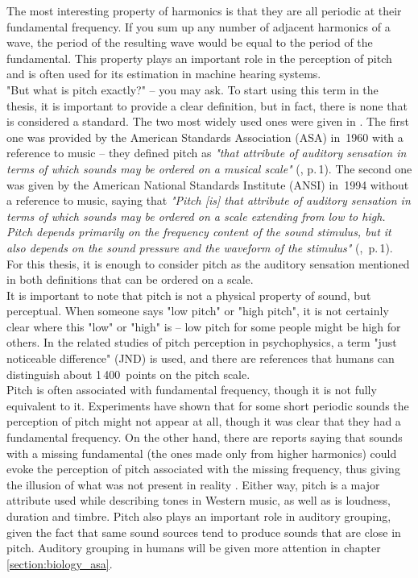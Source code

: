The most interesting property of harmonics is that they are all periodic at their fundamental frequency. If you sum up any number of adjacent harmonics of a wave, the period of the resulting wave would be equal to the period of the fundamental. This property plays an important role in the perception of pitch and is often used for its estimation in machine hearing systems.\\

"But what is pitch exactly?" -- you may ask. To start using this term in the thesis, it is important to provide a clear definition, but in fact, there is none that is considered a standard. The two most widely used ones were given in \cite{Plack2005}. The first one was provided by the American Standards Association (ASA) in~1960 with a reference to music -- they defined pitch as \textit{"that attribute of auditory sensation in terms of which sounds may be ordered on a musical scale"} (\cite{Plack2005}, p.\,1). The second one was given by the American National Standards Institute (ANSI) in~1994 without a reference to music, saying that \textit{"Pitch [is] that attribute of auditory sensation in terms of which sounds may be ordered on a scale extending from low to high. Pitch depends primarily on the frequency content of the sound stimulus, but it also depends on the sound pressure and the waveform of the stimulus"} (\cite{Plack2005},~p.\,1). For this thesis, it is enough to consider pitch as the auditory sensation mentioned in both definitions that can be ordered on a scale.\\

It is important to note that pitch is not a physical property of sound, but perceptual. When someone says "low pitch" or "high pitch", it is not certainly clear where this "low" or "high" is -- low pitch for some people might be high for others. In the related studies of pitch perception in psychophysics, a term "just noticeable difference" (JND) is used, and there are references that humans can distinguish about 1\,400~points on the pitch scale.\\

Pitch is often associated with fundamental frequency, though it is not fully equivalent to it. Experiments have shown that for some short periodic sounds the perception of pitch might not appear at all, though it was clear that they had a fundamental frequency. On the other hand, there are reports saying that sounds with a missing fundamental (the ones made only from higher harmonics) could evoke the perception of pitch associated with the missing frequency, thus giving the illusion of what was not present in reality \cite{Schnupp2011}. Either way, pitch is a major attribute used while describing tones in Western music, as well as is loudness, duration and timbre. Pitch also plays an important role in auditory grouping, given the fact that same sound sources tend to produce sounds that are close in pitch. Auditory grouping in humans will be given more attention in chapter \ref{section:biology_asa}.

